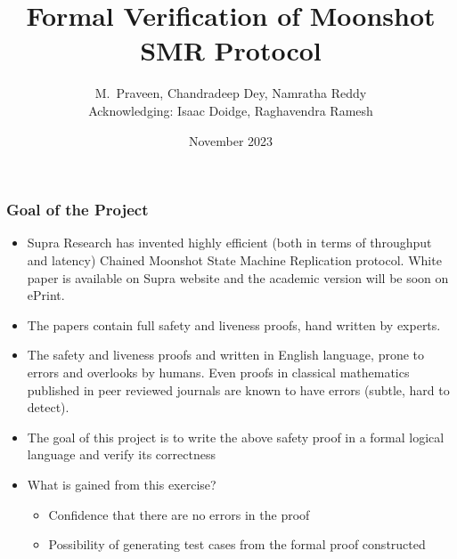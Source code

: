 \documentclass{beamer}
\title{Formal Verification of Moonshot SMR Protocol}
\author{ M.~Praveen, Chandradeep Dey, Namratha Reddy
\\ Acknowledging: Isaac Doidge, Raghavendra Ramesh}
\institute{Chennai Mathematical Institute ~\textbar~ Supra Oracles }
\date{November 2023}
\begin{document}
\begin{frame}
    \titlepage
\end{frame}

\begin{frame}
    \frametitle{Goal of the Project}
    \begin{itemize}
        \item Supra Research has invented highly efficient (both in
            terms of throughput and latency) Chained Moonshot State
            Machine Replication protocol. White paper is available on
            Supra website and the academic version will be soon on
            ePrint.
            \pause
            \vfill
        \item The papers contain full safety and liveness proofs, hand
            written by experts.
            \pause
            \vfill
        \item The safety and liveness proofs and written in English
            language, prone to errors and overlooks by humans. Even
            proofs in classical mathematics published in peer reviewed
            journals are known to have errors (subtle, hard to
            detect).
        \item The goal of this project is to write the above safety
            proof in a formal logical language and verify its
            correctness
            \pause
            \vfill
        \item What is gained from this exercise? \pause
            \vfill
            \begin{itemize}
                \item Confidence that there are no errors in the proof
                    \pause
                    \vfill
                \item Possibility of generating test cases from the
                    formal proof constructed
            \end{itemize}
    \end{itemize}
\end{frame}
\end{document}
